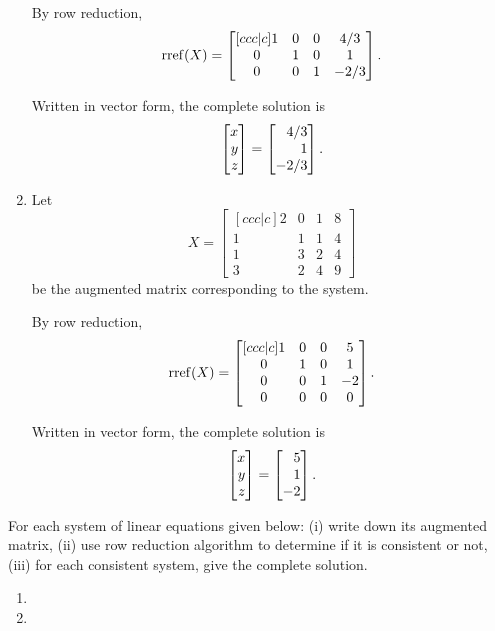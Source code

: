 \begin{exercises}
\begin{problist}
\begin{solution}
\begin{enumerate}
				By row reduction,
				\[
					\operatorname{rref}(X)=
					\begin{bmatrix}[ccc|c]
						1 & 0 & 0 & 4/3\\
						0 & 1 & 0 & 1\\
						0 & 0 & 1 & -2/3
					\end{bmatrix}.
				\]
				
				Written in vector form, the complete solution is
				\[
					\mat{x\\y\\z} = \mat{4/3\\1\\-2/3}.
				\]
				\item 
				Let
				\[
					X=
					\begin{bmatrix}[ccc|c]
						2 & 0 & 1 & 8\\
						1 & 1 & 1 & 4\\
						1 & 3 & 2 & 4\\
						3 & 2 & 4 & 9
					\end{bmatrix}
				\]
				be the augmented matrix corresponding to the system.
				
				By row reduction,
				\[
					\operatorname{rref}(X)=
					\begin{bmatrix}[ccc|c]
						1 & 0 & 0 & 5\\
						0 & 1 & 0 & 1\\
						0 & 0 & 1 & -2\\
						0 & 0 & 0 & 0
					\end{bmatrix}.
				\]
				
				Written in vector form, the complete solution is
				\[
					\mat{x\\y\\z} = \mat{5\\1\\-2}.
				\]
			\end{enumerate}
		\end{solution}

		\prob For each system of linear equations given below: (i) write down
		its augmented matrix, (ii) use row reduction algorithm to determine if it
		is consistent or not, (iii) for each consistent system, give the complete
		solution.
		\begin{enumerate}
			\item {}

			\item {}


\end{enumerate}
\end{problist}
\end{exercises}
